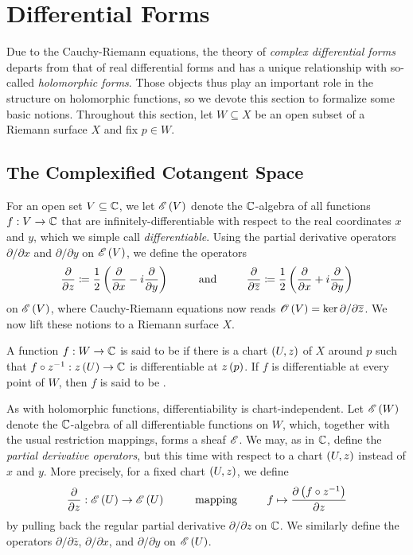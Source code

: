 \documentclass[../Moduli_Spaces_of_Riemann_Surfaces.tex]{subfiles}
\begin{document}
    \section{Differential Forms}\label{CC:sec:differential_forms}
    Due to the Cauchy-Riemann equations, the theory of \textit{complex differential forms} departs from that of real differential forms and has a unique relationship with so-called \textit{holomorphic forms}. Those objects thus play an important role in the structure on holomorphic functions, so we devote this section to formalize some basic notions. Throughout this section, let $W\subseteq X$ be an open subset of a Riemann surface $X$ and fix $p\in W$.
    \subsection{The Complexified Cotangent Space}
    For an open set $V\subseteq\mathbb{C}$, we let $\mathscr{E}\left(V\right)$ denote the $\mathbb{C}$-algebra of all functions $f:V\to\mathbb{C}$ that are infinitely-differentiable with respect to the real coordinates $x$ and $y$, which we simple call \textit{differentiable}. Using the partial derivative operators $\partial/\partial x$ and $\partial/\partial y$ on $\mathscr{E}\left(V\right)$, we define the operators
    \begin{equation*}
        \frac{\partial}{\partial z}\coloneqq\frac{1}{2}\l(\frac{\partial}{\partial x}-i\frac{\partial}{\partial y}\r)\ \ \ \ \ \ \ \ \textrm{and}\ \ \ \ \ \ \ \ \frac{\partial}{\partial\bar{z}}\coloneqq\frac{1}{2}\l(\frac{\partial}{\partial x}+i\frac{\partial}{\partial y}\r)
    \end{equation*}
    on $\mathscr{E}\left(V\right)$, where Cauchy-Riemann equations now reads $\mathscr{O}\left(V\right)=\ker\partial/\partial\overline{z}$. We now lift these notions to a Riemann surface $X$.
    \begin{definition}
        A function $f:W\to\mathbb{C}$ is said to be  if there is a chart $\left(U,z\right)$ of $X$ around $p$ such that $f\circ z^{-1}:z\left(U\right)\to\mathbb{C}$ is differentiable at $z\left(p\right)$. If $f$ is differentiable at every point of $W$, then $f$ is said to be .
    \end{definition}
    \begin{remark}
        As with holomorphic functions, differentiability is chart-independent. Let $\mathscr{E}\left(W\right)$ denote the $\mathbb{C}$-algebra of all differentiable functions on $W$, which, together with the usual restriction mappings, forms a sheaf $\mathscr{E}$. We may, as in $\mathbb{C}$, define the \textit{partial derivative operators}, but this time with respect to a chart $\left(U,z\right)$ instead of $x$ and $y$. More precisely, for a fixed chart $\left(U,z\right)$, we define
        \begin{equation*}
            \frac{\partial}{\partial z}:\DIFF\l(U\r)\to\DIFF\l(U\r)\ \ \ \ \ \ \ \ \textrm{mapping}\ \ \ \ \ \ \ \ f\mapsto\frac{\partial\l(f\circ z^{-1}\r)}{\partial z}
        \end{equation*}
        by pulling back the regular partial derivative $\partial/\partial z$ on $\mathbb{C}$. We similarly define the operators $\partial/\partial\bar{z}$, $\partial/\partial x$, and $\partial/\partial y$ on $\mathscr{E}\left(U\right)$.\exqed
    \end{remark}
\end{document}
